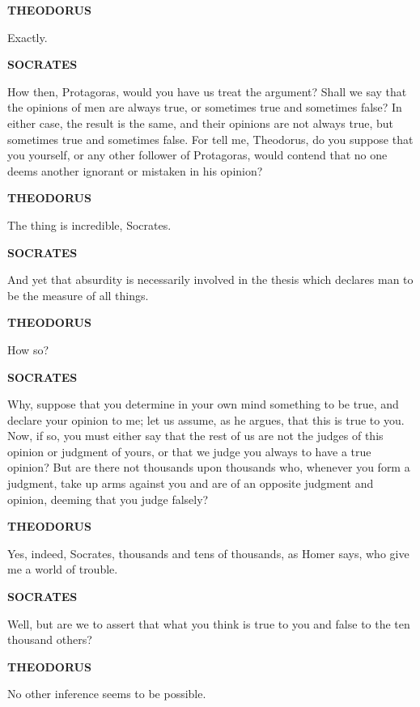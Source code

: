 \documentclass[11pt,letter]{article}
\begin{document}
\par \textbf{THEODORUS}
\par   Exactly.

\par \textbf{SOCRATES}
\par   How then, Protagoras, would you have us treat the argument? Shall we say that the opinions of men are always true, or sometimes true and sometimes false? In either case, the result is the same, and their opinions are not always true, but sometimes true and sometimes false. For tell me, Theodorus, do you suppose that you yourself, or any other follower of Protagoras, would contend that no one deems another ignorant or mistaken in his opinion?

\par \textbf{THEODORUS}
\par   The thing is incredible, Socrates.

\par \textbf{SOCRATES}
\par   And yet that absurdity is necessarily involved in the thesis which declares man to be the measure of all things.

\par \textbf{THEODORUS}
\par   How so?

\par \textbf{SOCRATES}
\par   Why, suppose that you determine in your own mind something to be true, and declare your opinion to me; let us assume, as he argues, that this is true to you. Now, if so, you must either say that the rest of us are not the judges of this opinion or judgment of yours, or that we judge you always to have a true opinion? But are there not thousands upon thousands who, whenever you form a judgment, take up arms against you and are of an opposite judgment and opinion, deeming that you judge falsely?

\par \textbf{THEODORUS}
\par   Yes, indeed, Socrates, thousands and tens of thousands, as Homer says, who give me a world of trouble.

\par \textbf{SOCRATES}
\par   Well, but are we to assert that what you think is true to you and false to the ten thousand others?

\par \textbf{THEODORUS}
\par   No other inference seems to be possible.
\end{document}
